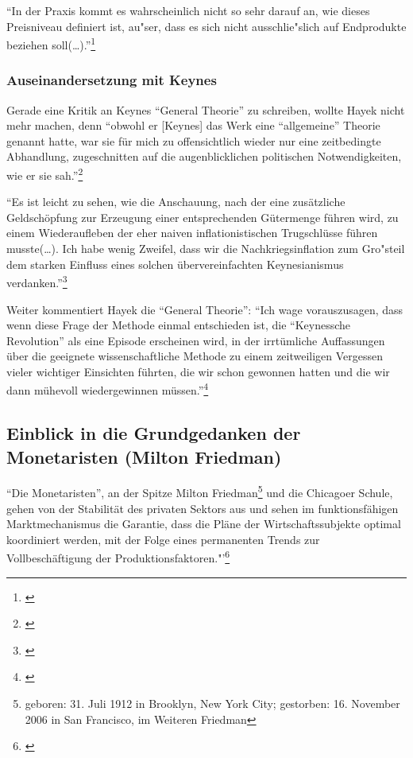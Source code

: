 \documentclass[
        onecolumn,
        a4paper,
        abstracton,
        parskip=half
        ,final
        ]{scrartcl}
\begin{document}
"`In der Praxis kommt es wahrscheinlich nicht so sehr darauf an, wie dieses Preisniveau definiert ist, au{"s}er, dass es sich nicht ausschlie{"s}lich auf Endprodukte beziehen soll(\ldots)."'\footnote[426]{\citep*[S.423]{hayek1971}}

\subsubsection{Auseinandersetzung mit Keynes}

Gerade eine Kritik an Keynes "`General Theorie"' zu schreiben, wollte Hayek nicht mehr machen, denn "`obwohl er [Keynes] das Werk eine "`allgemeine"' Theorie genannt hatte, war sie f{\"u}r mich zu offensichtlich wieder nur eine zeitbedingte Abhandlung, zugeschnitten auf die augenblicklichen politischen Notwendigkeiten, wie er sie sah."'\footnote[427]{\citep*[S.91]{Hayek1969}}

"`Es ist leicht zu sehen, wie die Anschauung, nach der eine zus{\"a}tzliche Geldsch{\"o}pfung zur Erzeugung einer entsprechenden G{\"u}termenge f{\"u}hren wird, zu einem Wiederaufleben der eher naiven inflationistischen Trugschl{\"u}sse f{\"u}hren musste(\ldots). Ich habe wenig Zweifel, dass wir die Nachkriegsinflation zum Gro{"s}teil dem starken Einfluss eines solchen {\"u}bervereinfachten Keynesianismus verdanken."'\footnote[428]{\citep*[S.93]{Hayek1969}}

Weiter kommentiert Hayek die "`General Theorie"':
"`Ich wage vorauszusagen, dass wenn diese Frage der Methode einmal entschieden ist, die "`Keynessche Revolution"' als eine Episode erscheinen wird, in der irrt{\"u}mliche Auffassungen {\"u}ber die geeignete wissenschaftliche Methode zu einem zeitweiligen Vergessen vieler wichtiger Einsichten f{\"u}hrten, die wir schon gewonnen hatten und die wir dann m{\"u}hevoll wiedergewinnen m{\"u}ssen."'\footnote[429]{\citep*[S.96]{Hayek1969}}

\subsection{Einblick in die Grundgedanken der Monetaristen (Milton Friedman)} %

"`Die Monetaristen"', an der Spitze Milton Friedman\footnote[16]{geboren: 31. Juli 1912 in Brooklyn, New York City; gestorben: 16. November 2006 in San Francisco, im Weiteren Friedman} und die Chicagoer Schule, gehen von der Stabilit{\"a}t des privaten Sektors aus und sehen im
funktionsf{\"a}higen Marktmechanismus die Garantie, dass die Pl{\"a}ne der Wirtschaftssubjekte optimal koordiniert werden, mit der Folge eines permanenten Trends zur Vollbesch{\"a}ftigung der Produktionsfaktoren."'\footnote[501]{\citep*[vgl.][S.210]{peters2000}}
\end{document}
